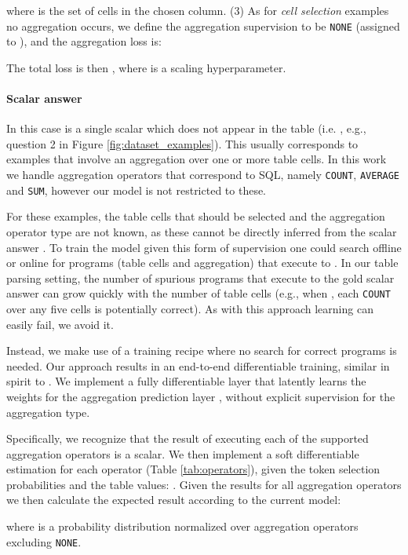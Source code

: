 \documentclass[11pt,a4paper]{article}
\begin{document}
where  is the set of cells in the chosen column.
(3) As for \textit{cell selection} examples no aggregation occurs, we define the aggregation supervision to be \texttt{NONE} (assigned to ), and the aggregation loss is:

The total loss is then ,
where  is a scaling hyperparameter.

\paragraph{Scalar answer} In this case  is a single scalar  which does not appear in the table (i.e. , e.g., question 2 in Figure \ref{fig:dataset_examples}). This usually corresponds to examples that involve an aggregation over one or more table cells. In this work we handle aggregation operators that correspond to SQL, namely \texttt{COUNT}, \texttt{AVERAGE} and \texttt{SUM}, however our model is not restricted to these. 

For these examples, the table cells that should be selected and the aggregation operator type are not known, as these cannot be directly inferred from the scalar answer . To train the model given this form of supervision one could search offline \cite{dua2019drop,andor2019giving} or online \cite{berant2013freebase, liang2018mapo} for programs (table cells and aggregation) that execute to . In our table parsing setting, the number of spurious programs that execute to the gold scalar answer can grow quickly with the number of table cells (e.g., when , each \texttt{COUNT} over any five cells is potentially correct). As with this approach learning can easily fail, we avoid it.

Instead, we make use of a training recipe where no search for correct programs is needed. Our approach results in an end-to-end differentiable training, similar in spirit to . We implement a fully differentiable layer that latently learns the weights for the aggregation prediction layer , without explicit supervision for the aggregation type.

Specifically, we recognize that the result of executing each of the supported aggregation operators is a scalar. We then implement a soft differentiable estimation for each operator (Table \ref{tab:operators}), given the token selection probabilities and the table values: . Given the results for all aggregation operators we then calculate the expected result according to the current model: 

where  is a probability distribution normalized over aggregation operators excluding \texttt{NONE}. 
\end{document}
